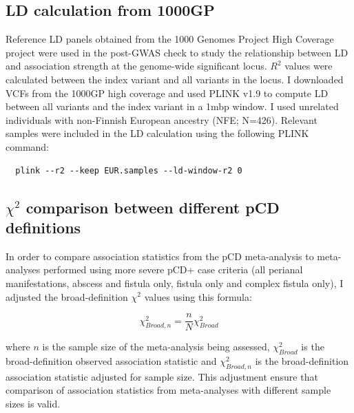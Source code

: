 

\subsection{LD calculation from 1000GP}
Reference LD panels obtained from the 1000 Genomes Project High Coverage project \cite{1000gphc} were used in the post-GWAS check to study the relationship between LD and association strength at the genome-wide significant locus. $R^{2}$ values were calculated between the index variant and all variants in the locus. I downloaded VCFs from the 1000GP high coverage and used PLINK v1.9 to compute LD between all variants and the index variant in a 1mbp window. I used unrelated individuals with non-Finnish European ancestry (NFE; N=426). Relevant samples were included in the LD calculation using the following PLINK command:
\begin{verbatim}
  plink --r2 --keep EUR.samples --ld-window-r2 0 
\end{verbatim}

\subsection{$\chi^{2}$ comparison between different pCD definitions}
In order to compare association statistics from the pCD meta-analysis to meta-analyses performed using more severe pCD+ case criteria (all perianal manifestations, abscess and fistula only, fistula only and complex fistula only), I adjusted the broad-definition $\chi^{2}$ values using this formula:

 $$\chi^{2}_{Broad,n}=\frac{n}{N}\chi^{2}_{Broad}$$

where $n$ is the sample size of the meta-analysis being assessed, $\chi^{2}_{Broad}$ is the broad-definition observed association statistic and  $\chi^{2}_{Broad,n}$ is the broad-definition association statistic adjusted for sample size. This adjustment ensure that comparison of association statistics from meta-analyses with different sample sizes is valid.

